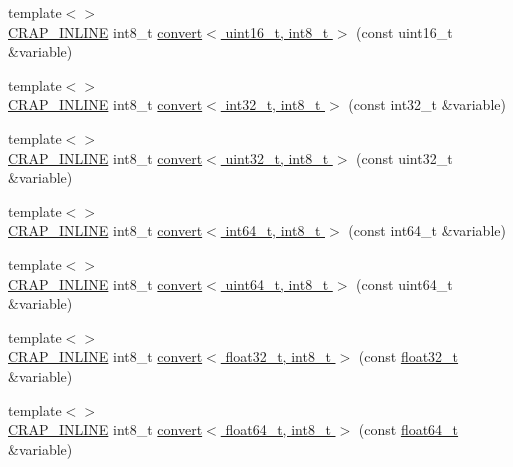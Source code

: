 \begin{DoxyCompactItemize}
\item 
{\footnotesize template$<$$>$ }\\\hyperlink{config__x86_8h_a5a40526b8d842e7ff731509998bb0f1c}{C\+R\+A\+P\+\_\+\+I\+N\+L\+I\+N\+E} int8\+\_\+t \hyperlink{namespacecrap_a676cd239b80b1c2aaf89b63f313800f8}{convert$<$ uint16\+\_\+t, int8\+\_\+t $>$} (const uint16\+\_\+t \&variable)
\item 
{\footnotesize template$<$$>$ }\\\hyperlink{config__x86_8h_a5a40526b8d842e7ff731509998bb0f1c}{C\+R\+A\+P\+\_\+\+I\+N\+L\+I\+N\+E} int8\+\_\+t \hyperlink{namespacecrap_a91acc42717c64a94df2b15986269f509}{convert$<$ int32\+\_\+t, int8\+\_\+t $>$} (const int32\+\_\+t \&variable)
\item 
{\footnotesize template$<$$>$ }\\\hyperlink{config__x86_8h_a5a40526b8d842e7ff731509998bb0f1c}{C\+R\+A\+P\+\_\+\+I\+N\+L\+I\+N\+E} int8\+\_\+t \hyperlink{namespacecrap_a712b151c55180b53fe2c610b8624bba0}{convert$<$ uint32\+\_\+t, int8\+\_\+t $>$} (const uint32\+\_\+t \&variable)
\item 
{\footnotesize template$<$$>$ }\\\hyperlink{config__x86_8h_a5a40526b8d842e7ff731509998bb0f1c}{C\+R\+A\+P\+\_\+\+I\+N\+L\+I\+N\+E} int8\+\_\+t \hyperlink{namespacecrap_a3ee286498cb4ee0dacd2aa4aaa8b9b7c}{convert$<$ int64\+\_\+t, int8\+\_\+t $>$} (const int64\+\_\+t \&variable)
\item 
{\footnotesize template$<$$>$ }\\\hyperlink{config__x86_8h_a5a40526b8d842e7ff731509998bb0f1c}{C\+R\+A\+P\+\_\+\+I\+N\+L\+I\+N\+E} int8\+\_\+t \hyperlink{namespacecrap_a41c26330623d6e71588e90b8c6a53816}{convert$<$ uint64\+\_\+t, int8\+\_\+t $>$} (const uint64\+\_\+t \&variable)
\item 
{\footnotesize template$<$$>$ }\\\hyperlink{config__x86_8h_a5a40526b8d842e7ff731509998bb0f1c}{C\+R\+A\+P\+\_\+\+I\+N\+L\+I\+N\+E} int8\+\_\+t \hyperlink{namespacecrap_a90fd8cf1e4590717d24b9215c3da7f4d}{convert$<$ float32\+\_\+t, int8\+\_\+t $>$} (const \hyperlink{crap__types_8h_a4611b605e45ab401f02cab15c5e38715}{float32\+\_\+t} \&variable)
\item 
{\footnotesize template$<$$>$ }\\\hyperlink{config__x86_8h_a5a40526b8d842e7ff731509998bb0f1c}{C\+R\+A\+P\+\_\+\+I\+N\+L\+I\+N\+E} int8\+\_\+t \hyperlink{namespacecrap_ab5e03f38a90c76bf23317e17a21989c9}{convert$<$ float64\+\_\+t, int8\+\_\+t $>$} (const \hyperlink{crap__types_8h_ac55f3ae81b5bc9053760baacf57e47f4}{float64\+\_\+t} \&variable)

\end{DoxyCompactItemize}
